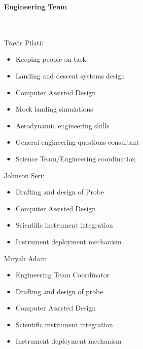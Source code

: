 \documentclass[%
 portrait,
 aapm,
 mph,%
 amsmath,amssymb,
 reprint,%
]{revtex4-2}
\begin{document}
\begin{Large}\textbf{Engineering Team}\end{Large}\\ \\
Travis Pilati:
\begin{itemize}
    \item Keeping people on task
    \item Landing and descent systems design
    \item Computer Assisted Design
    \item Mock landing simulations
    \item Aerodynamic engineering skills
    \item General engineering questions consultant
    \item Science Team/Engineering coordination
\end{itemize}
Johnson Seri:
\begin{itemize}
    \item Drafting and design of Probe
    \item Computer Assisted Design
    \item Scientific instrument integration
    \item Instrument deployment mechanism
\end{itemize}
Miryah Adair:
\begin{itemize}
    \item Engineering Team Coordinator
    \item Drafting and design of probe
    \item Computer Assisted Design
    \item Scientific instrument integration
    \item Instrument deployment mechanism
\end{itemize}
\end{document}
